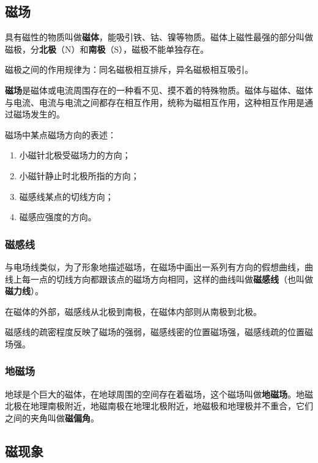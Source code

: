 
\subsection{磁场}

具有磁性的物质叫做\textbf{磁体}，能吸引铁、钴、镍等物质。磁体上磁性最强的部分叫做磁极，分\textbf{北极}（$\mathrm N$）和\textbf{南极}（$\mathrm S$），磁极不能单独存在。

磁极之间的作用规律为：同名磁极相互排斥，异名磁极相互吸引。

\textbf{磁场}是磁体或电流周围存在的一种看不见、摸不着的特殊物质。磁体与磁体、磁体与电流、电流与电流之间都存在相互作用，统称为磁相互作用，这种相互作用是通过磁场发生的。

磁场中某点磁场方向的表述：

\begin{enumerate}
\item 小磁针北极受磁场力的方向；
\item 小磁针静止时北极所指的方向；
\item 磁感线某点的切线方向；
\item 磁感应强度的方向。
\end{enumerate}

\subsubsection{磁感线}
与电场线类似，为了形象地描述磁场，在磁场中画出一系列有方向的假想曲线，曲线上每一点的切线方向都跟该点的磁场方向相同，这样的曲线叫做\textbf{磁感线}（也叫做\textbf{磁力线}）。

在磁体的外部，磁感线从北极到南极，在磁体内部则从南极到北极。

磁感线的疏密程度反映了磁场的强弱，磁感线密的位置磁场强，磁感线疏的位置磁场强。

\subsubsection{地磁场}

地球是个巨大的磁体，在地球周围的空间存在着磁场，这个磁场叫做\textbf{地磁场}。地磁北极在地理南极附近，地磁南极在地理北极附近，地磁极和地理极并不重合，它们之间的夹角叫做\textbf{磁偏角}。

\subsection{磁现象}

